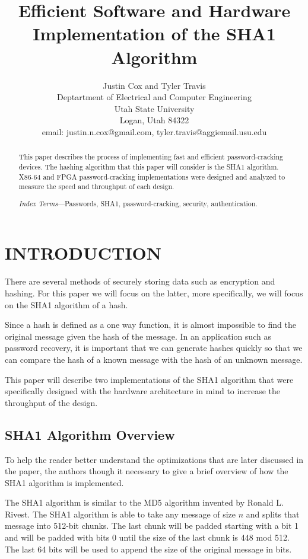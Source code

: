 \documentclass[letterpaper, 10 pt, conference]{ieeeconf}  %
\title{\LARGE \bf
Efficient Software and Hardware Implementation of the SHA1 Algorithm
}
\author{Justin Cox and Tyler Travis
\\ \small{Deptartment of Electrical and Computer Engineering}
\\ \small{Utah State University}
\\ \small{Logan, Utah 84322}
\\ \small{email: justin.n.cox@gmail.com, tyler.travis@aggiemail.usu.edu}
}
\begin{document}
\maketitle
\thispagestyle{empty}
\pagestyle{empty}


\begin{abstract}

This paper describes the process of implementing fast and efficient password-cracking devices.  The hashing algorithm that this paper will consider is the SHA1 algorithm.  X86-64 and FPGA password-cracking implementations were designed and analyzed to measure the speed and throughput of each design.

\emph{Index Terms}---Passwords, SHA1, password-cracking, security,  authentication.    

\end{abstract}

\section{INTRODUCTION}

There are several methods of securely storing data such as encryption and hashing.  For this paper we will focus on the latter, more specifically, we will focus on the SHA1 algorithm of a hash.

Since a hash is defined as a one way function, it is almost impossible to find the original message given the hash of the message.  In an application such as password recovery, it is important that we can generate hashes quickly so that we can compare the hash of a known message with the hash of an unknown message.

This paper will describe two implementations of the SHA1 algorithm that were specifically designed with the hardware architecture in mind to increase the throughput of the design.

\subsection{SHA1 Algorithm Overview}

To help the reader better understand the optimizations that are later discussed in the paper, the authors though it necessary to give a brief overview of how the SHA1 algorithm is implemented.

The SHA1 algorithm is similar to the MD5 algorithm invented by Ronald L. Rivest.  The SHA1 algorithm is able to take any message of size $n$ and splits that message into 512-bit chunks.  The last chunk will be padded starting with a bit 1 and will be padded with bits 0 until the size of the last chunk is 448 mod 512.  The last 64 bits will be used to append the size of the original message in bits.
\end{document}
